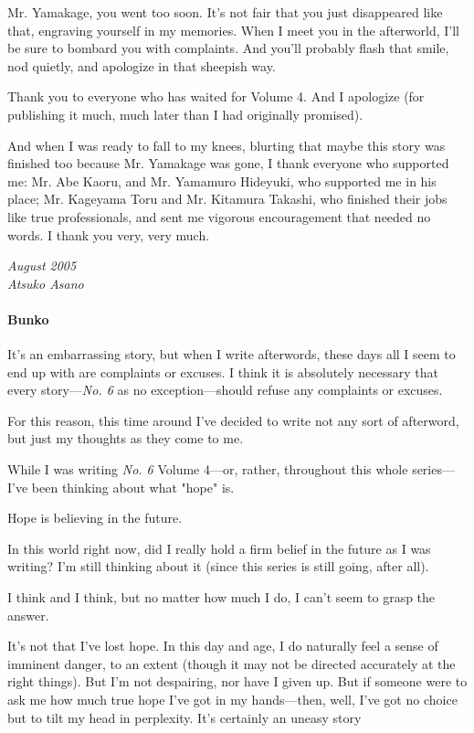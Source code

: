 Mr. Yamakage, you went too soon. It's not fair that you just disappeared
like that, engraving yourself in my memories. When I meet you in the
afterworld, I'll be sure to bombard you with complaints. And you'll
probably flash that smile, nod quietly, and apologize in that sheepish
way.

Thank you to everyone who has waited for Volume 4. And I apologize (for
publishing it much, much later than I had originally promised).

And when I was ready to fall to my knees, blurting that maybe this story
was finished too because Mr. Yamakage was gone, I thank everyone who
supported me: Mr. Abe Kaoru, and Mr. Yamamuro Hideyuki, who supported me
in his place; Mr. Kageyama Toru and Mr. Kitamura Takashi, who finished
their jobs like true professionals, and sent me vigorous encouragement
that needed no words. I thank you very, very much.

\myspace

\emph{August 2005\\
	Atsuko Asano}

\paragraph{Bunko}

It's an embarrassing story, but when I write afterwords, these days all
I seem to end up with are complaints or excuses. I think it is
absolutely necessary that every story---\emph{No. 6} as no exception---should
refuse any complaints or excuses.

For this reason, this time around I've decided to write not any sort of
afterword, but just my thoughts as they come to me.

While I was writing \emph{No. 6} Volume 4---or, rather, throughout this whole
series---I've been thinking about what "hope" is.

Hope is believing in the future.

In this world right now, did I really hold a firm belief in the future
as I was writing? I'm still thinking about it (since this series is
still going, after all).

I think and I think, but no matter how much I do, I can't seem to grasp
the answer.

It's not that I've lost hope. In this day and age, I do naturally feel a
sense of imminent danger, to an extent (though it may not be directed
accurately at the right things). But I'm not despairing, nor have I
given up. But if someone were to ask me how much true hope I've got in
my hands---then, well, I've got no choice but to tilt my head in
perplexity. It's certainly an uneasy story\el 

